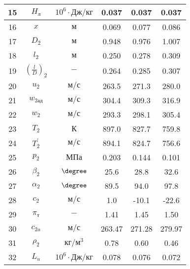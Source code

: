 \begin{center}
\begin{longtable}{|c|c|c|c|c|c|}
        15 & $H_л$ & $10^6 \cdot Дж/кг$ & 0.037 & 0.037 & 0.037 \\\hline
        
        16 & $x$ & $м$ & 0.069 & 0.077 & 0.086 \\\hline
        
        17 & $D_2$ & $м$ & 0.948 & 0.976 & 1.007 \\\hline
        
        18 & $l_2$ & $м$ & 0.250 & 0.278 & 0.309 \\\hline
        
        19 & $\left( \frac{l}{D} \right)_2$ & $-$ & 0.264 & 0.285 & 0.307 \\\hline
        
        20 & $u_2$ & $м/с$ & 263.5 & 271.3 & 280.0 \\\hline
        
        21 & $w_{2ад}$ & $м/с$ & 304.4 & 309.3 & 316.9 \\\hline
        
        22 & $w_2$ & $м/с$ & 293.3 & 298.1 & 305.4 \\\hline
        
        23 & $T_2$ & $К$ & 897.0 & 827.7 & 759.8 \\\hline
        
        24 & $T_2^\prime$ & $м/с$ & 894.1 & 824.7 & 756.6 \\\hline
        
        25 & $p_2$ & $МПа$ & 0.203 & 0.144 & 0.101 \\\hline
        
        26 & $\beta_2$ & $\degree$ & 25.6 & 28.8 & 32.6 \\\hline
        
        27 & $\alpha_2$ & $\degree$ & 89.5 & 94.0 & 97.8 \\\hline
        
        28 & $c_2$ & $м/с$ & 1.0 & -10.1 & -22.6 \\\hline
        
        29 & $\pi_т$ & $-$ & 1.41 & 1.45 & 1.50 \\\hline
        
        30 & $c_{2a}$ & $м/с$ & 263.47 & 271.28 & 279.97 \\\hline
        
        31 & $\rho_2$ & $кг/м^3$ & 0.78 & 0.60 & 0.46 \\\hline
        
        32 & $L_u$ & $10^6 \cdot Дж/кг$ & 0.078 & 0.076 & 0.072 \\\hline
        

\end{longtable}
\end{center}
